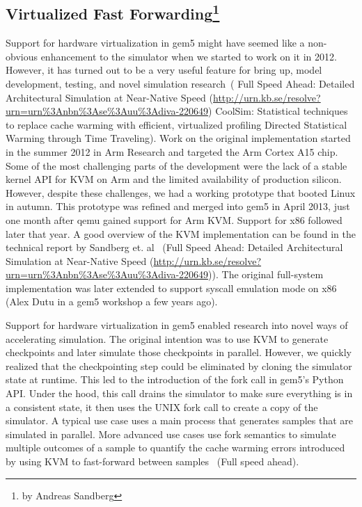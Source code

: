 \subsection[Virtualized Fast Forwarding]{Virtualized Fast Forwarding\footnote{by Andreas Sandberg}}

Support for hardware virtualization in gem5 might have seemed like a non-obvious enhancement to the simulator when we started to work on it in 2012.
However, it has turned out to be a very useful feature for bring up, model development, testing, and novel simulation research~\cite{}(
Full Speed Ahead: Detailed Architectural Simulation at Near-Native Speed (\url{http://urn.kb.se/resolve?urn=urn%3Anbn%3Ase%3Auu%3Adiva-220649})
CoolSim: Statistical techniques to replace cache warming with efficient, virtualized profiling
Directed Statistical Warming through Time Traveling).
Work on the original implementation started in the summer 2012 in Arm Research and targeted the Arm Cortex A15 chip. Some of the most challenging parts of the development were the lack of a stable kernel API for KVM on Arm and the limited availability of production silicon.
However, despite these challenges, we had a working prototype that booted Linux in autumn.
This prototype was refined and merged into gem5 in April 2013, just one month after qemu gained support for Arm KVM.
Support for x86 followed later that year.
A good overview of the KVM implementation can be found in the technical report by Sandberg et. al~\cite{} (Full Speed Ahead: Detailed Architectural Simulation at Near-Native Speed (\url{http://urn.kb.se/resolve?urn=urn%3Anbn%3Ase%3Auu%3Adiva-220649})).
The original full-system implementation was later extended to support syscall emulation mode on x86~\cite{} (Alex Dutu in a gem5 workshop a few years ago).

Support for hardware virtualization in gem5 enabled research into novel ways of accelerating simulation.
The original intention was to use KVM to generate checkpoints and later simulate those checkpoints in parallel.
However, we quickly realized that the checkpointing step could be eliminated by cloning the simulator state at runtime.
This led to the introduction of the fork call in gem5’s Python API.
Under the hood, this call drains the simulator to make sure everything is in a consistent state, it then uses the UNIX fork call to create a copy of the simulator.
A typical use case uses a main process that generates samples that are simulated in parallel.
More advanced use cases use fork semantics to simulate multiple outcomes of a sample to quantify the cache warming errors introduced by using KVM to fast-forward between samples~\cite{} (Full speed ahead).
